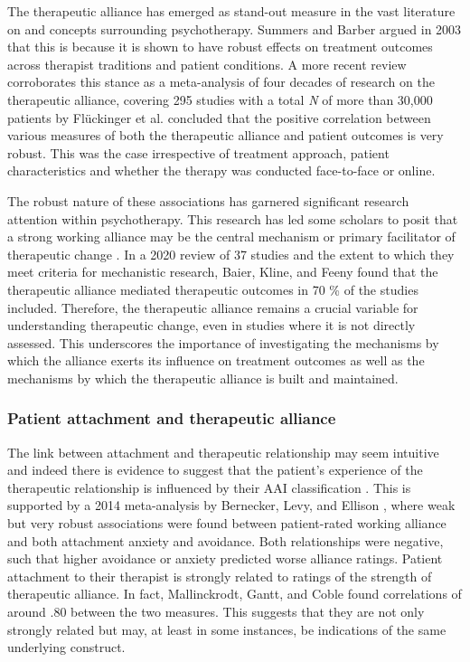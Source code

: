 \documentclass[12pt]{report}
\begin{document}
The therapeutic alliance has emerged as stand-out measure in the vast literature on and concepts surrounding psychotherapy. Summers and Barber \cite{Summers2003} argued in 2003 that this is because it is shown to have robust effects on treatment outcomes across therapist traditions and patient conditions.
A more recent review corroborates this stance as a meta-analysis of four decades of research on the therapeutic alliance, covering 295 studies with a total \textit{N} of more than 30,000 patients by Flückinger et al. \cite{Fluckinger2018} concluded that the positive correlation between various measures of both the therapeutic alliance and patient outcomes is very robust.
This was the case irrespective of treatment approach, patient characteristics and whether the therapy was conducted face-to-face or online.

The robust nature of these associations has garnered significant research attention within psychotherapy. This research has led some scholars to posit that a strong working alliance may be the central mechanism or primary facilitator of therapeutic change \cite{RodgersCailholBuiEtAl2010}.
In a 2020 review of 37 studies and the extent to which they meet criteria for mechanistic research, Baier, Kline, and Feeny \cite{Baier2020} found that the therapeutic alliance mediated therapeutic outcomes in 70 \% of the studies included.
Therefore, the therapeutic alliance remains a crucial variable for understanding therapeutic change, even in studies where it is not directly assessed.  This underscores the importance of investigating the mechanisms by which the alliance exerts its influence on treatment outcomes as well as the mechanisms by which the therapeutic alliance is built and maintained.

\subsubsection*{Patient attachment and therapeutic alliance}
The link between attachment and therapeutic relationship may seem intuitive and indeed there is evidence to suggest that the patient's experience of the therapeutic relationship is influenced by their AAI classification \cite{Talia2019}.
This is supported by a 2014 meta-analysis by Bernecker, Levy, and Ellison \cite{Bernecker2014}, where weak but very robust associations were found between patient-rated working alliance and both attachment anxiety and avoidance. Both relationships were negative, such that higher avoidance or anxiety predicted worse alliance ratings.
Patient attachment to their therapist is strongly related to ratings of the strength of therapeutic alliance. In fact, Mallinckrodt, Gantt, and Coble \cite{Mallinckrodt1995} found correlations of around .80 between the two measures. This suggests that they are not only strongly related but may, at least in some instances, be indications of the same underlying construct.
\end{document}
